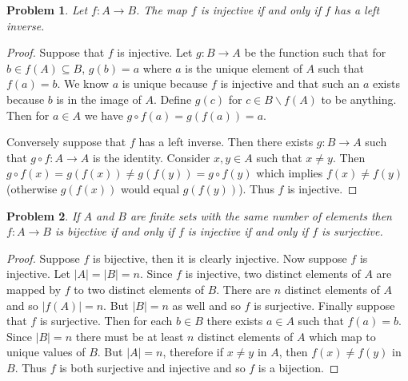 \documentclass{article}
\newtheorem{problem}{Problem}
\begin{document}
\begin{problem}
Let $f : A \to B$. The map $f$ is injective if and only if $f$ has a left inverse.
\end{problem}
\begin{proof}
Suppose that $f$ is injective. Let $g : B \to A$ be the function such that for $b \in f(A) \subseteq B$, $g(b) = a$ where $a$ is the unique element of $A$ such that $f(a) = b$. We know $a$ is unique because $f$ is injective and that such an $a$ exists because $b$ is in the image of $A$. Define $g(c)$ for $c \in B \backslash f(A)$ to be anything. Then for $a \in A$ we have $g \circ f(a) = g(f(a)) = a$.\newline

Conversely suppose that $f$ has a left inverse. Then there exists $g : B \to A$ such that $g \circ f : A \to A$ is the identity. Consider $x, y \in A$ such that $x \neq y$. Then $g \circ f(x) = g(f(x)) \neq g(f(y)) = g \circ f(y)$ which implies $f(x) \neq f(y)$ (otherwise $g(f(x))$ would equal $g(f(y))$). Thus $f$ is injective.
\end{proof}

\begin{problem}
If $A$ and $B$ are finite sets with the same number of elements then $f : A \to B$ is bijective if and only if $f$ is injective if and only if $f$ is surjective.
\end{problem}
\begin{proof}
Suppose $f$ is bijective, then it is clearly injective. Now suppose $f$ is injective. Let $|A| = |B| = n$. Since $f$ is injective, two distinct elements of $A$ are mapped by $f$ to two distinct elements of $B$. There are $n$ distinct elements of $A$ and so $|f(A)| = n$. But $|B| = n$ as well and so $f$ is surjective. Finally suppose that $f$ is surjective. Then for each $b \in B$ there exists $a \in A$ such that $f(a) = b$. Since $|B| = n$ there must be at least $n$ distinct elements of $A$ which map to unique values of $B$. But $|A| = n$, therefore if $x \neq y$ in $A$, then $f(x) \neq f(y)$ in $B$. Thus $f$ is both surjective and injective and so $f$ is a bijection.
\end{proof}
\end{document}
